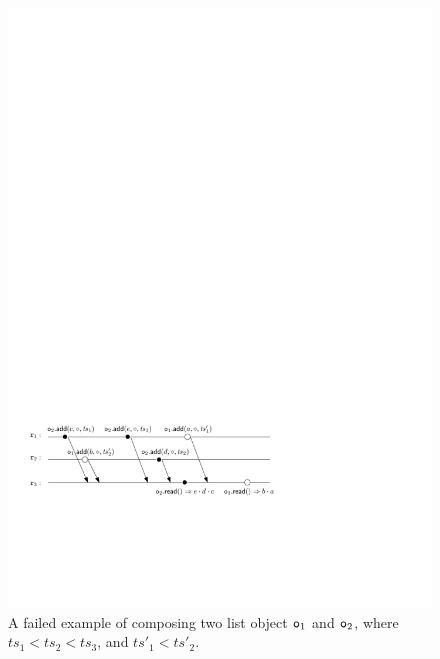 \begin{figure}[t]
  \centering
  \includegraphics[width=0.7 \textwidth]{figures/LWWReg-LWWReg-NoSTS.pdf}
\vspace{-10pt}
  \caption{A failed example of composing two \tonelinearizable list object $\mathtt{o}_1$ and $\mathtt{o}_2$, where $\mathit{ts}_1 < \mathit{ts}_2 < \mathit{ts}_3$, and $\mathit{ts}'_1 < \mathit{ts}'_2$.}
  \label{fig:a failed example of composing two last-write-win registers}
\end{figure}





